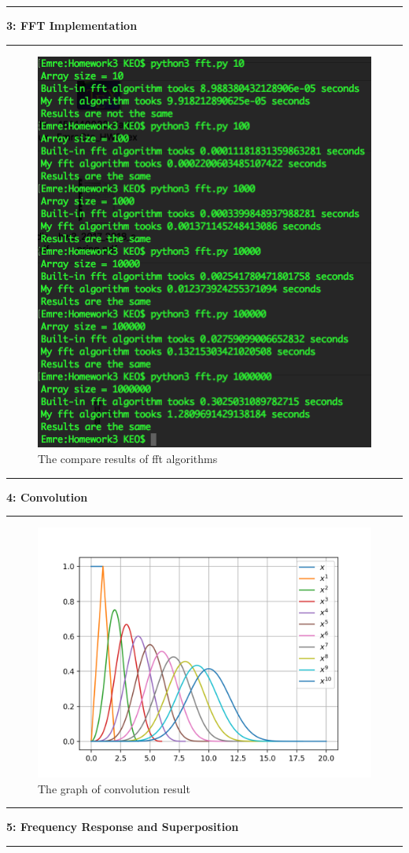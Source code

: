 \documentclass[11pt]{article}
\newcommand\question[2]{\vspace{.25in}\hrule\textbf{#1: #2}\vspace{.5em}\hrule\vspace{.10in}}
\begin{document}
\cleardoublepage

\question{3}{FFT Implementation} 

\begin{figure}[h]
	\centering
	\includegraphics[width=0.7\linewidth]{results}
	\caption{The compare results of fft algorithms}
	\label{fig:results}
\end{figure}

\cleardoublepage

\question{4}{Convolution} 

\begin{figure}[h]
	\centering
	\includegraphics[width=0.7\linewidth]{convolution}
	\caption{The graph of convolution result}
	\label{fig:convolution}
\end{figure}

\cleardoublepage

\question{5}{Frequency Response and Superposition} 
\end{document}
